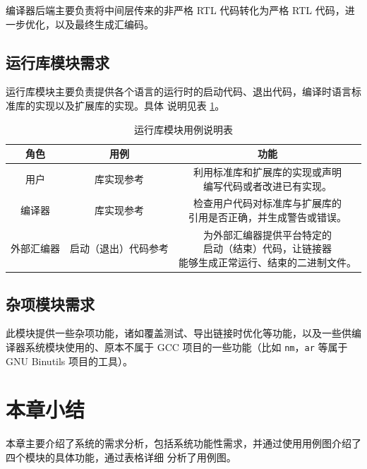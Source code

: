 \documentclass[12pt]{ctexrep}
\begin{document}
    编译器后端主要负责将中间层传来的非严格 RTL 代码转化为严格 RTL 代码，进一步优化，以及最终生成汇编码\cite{gcc-backend}。

    \subsection{运行库模块需求}

    运行库模块主要负责提供各个语言的运行时的启动代码、退出代码，编译时语言标准库的实现以及扩展库的实现。具体
    说明见表 \ref{tab:runtime-lib-usercases}。

    \begin{table}[hp]
        \centering
        \caption{运行库模块用例说明表}
        \label{tab:runtime-lib-usercases}
        \begin{tabular}{|c|c|c|}
            \hline
            角色 & 用例 & 功能 \\ \hline
            用户 & 库实现参考 & \makecell{利用标准库和扩展库的实现或声明 \\ 编写代码或者改进已有实现。} \\ \hline
            编译器 & 库实现参考 & \makecell{检查用户代码对标准库与扩展库的 \\ 引用是否正确，并生成警告或错误。} \\ \hline
            外部汇编器 & 启动（退出）代码参考 & \makecell{为外部汇编器提供平台特定的 \\ 启动（结束）代码，让链接器 \\ 能够生成正常运行、结束的二进制文件。} \\ \hline
        \end{tabular}
    \end{table}

    \subsection{杂项模块需求}

    此模块提供一些杂项功能，诸如覆盖测试、导出链接时优化等功能，以及一些供编译器系统模块使用的、原本不属于
    GCC 项目的一些功能（比如 \verb|nm|，\verb|ar| 等属于 GNU Binutils 项目的工具）。

    \section{本章小结}

    本章主要介绍了系统的需求分析，包括系统功能性需求，并通过使用用例图介绍了四个模块的具体功能，通过表格详细
    分析了用例图。
\end{document}
